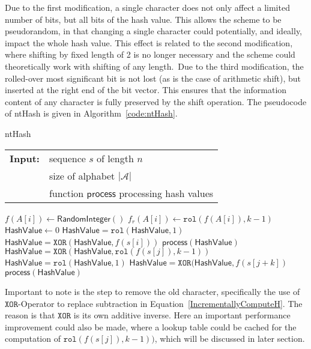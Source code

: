\documentclass[11pt,a4paper]{scrartcl}
\newcommand{\HashValue}[0]{\mathsf{HashValue}}
\newcommand{\XOR}[0]{\mathtt{XOR}}
\newcommand{\rol}[0]{\mathtt{rol}}
\begin{document}
Due to the first modification, a single character does not only affect
a limited number of bits, but all bits of the hash value. This
allows the scheme to be pseudorandom, in that changing a single
character could potentially, and ideally, impact the whole hash value. This
effect is related to the second modification, where shifting by fixed
length of 2 is no
longer necessary and the scheme could theoretically work with shifting of
any length.~\cite{cohen1997recursive}Due to the third modification, the rolled-over most significant
bit is not lost (as is the case of arithmetic shift),
but inserted at the right end of the bit vector.
This ensures
that the information content of any character is fully preserved by the
shift operation.
The pseudocode of ntHash is given in Algorithm~\ref{code:ntHash}.
\begin{algorithm}[t]
\caption{ntHash}
\label{code:ntHash}
\begin{tabular}{@{}l@{~}l}
\textbf{Input:}&sequence $s$ of length $n$\\
               &size of alphabet $|\mathcal{A}|$\\
               &function \(\mathsf{process}\) processing hash values
\end{tabular}
\begin{algorithmic}
 
\State \(f(A[i]) \gets \mathsf{RandomInteger}()\)
\EndFor
{} 
\State \(f_r(A[i]) \gets \rol(f(A[i]),k-1)\)
\EndFor
\State \(\HashValue \gets 0\)
 
\State \(\HashValue = \rol(\HashValue,1)\)
\State \(\HashValue = \XOR(\HashValue,f(s[i]))\)
\EndFor
\State \(\mathsf{process}(\HashValue)\)
 
\State \(\HashValue = \XOR(\HashValue,\rol(f(s[j]),k-1))\)
\State \(\HashValue = \rol(\HashValue,1)\)
\State \(\HashValue = \XOR(\HashValue,f(s[j+k])\)
\State \(\mathsf{process}(\HashValue)\)
\EndFor
\end{algorithmic}
\end{algorithm}

Important to note is the step to remove the old character, specifically the use of $\XOR$-Operator to replace subtraction in Equation~\ref{IncrementallyComputeH}. The reason is that $\XOR$ is its own additive inverse. Here an important performance improvement could also be made, where a lookup table could be cached for the computation of $\rol(f(s[j]),k-1))$, which will be discussed in later section.
\end{document}
